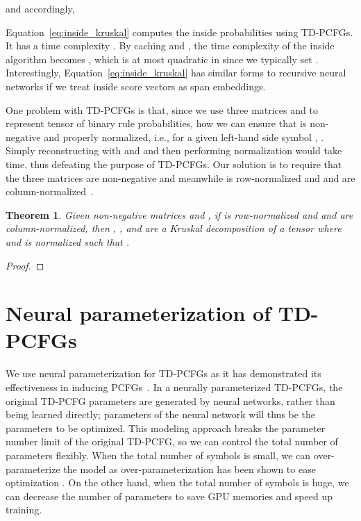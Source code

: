 \documentclass[11pt]{article}
\newtheorem{theorem}{Theorem}
\begin{document}
and accordingly,

Equation~\ref{eq:inside_kruskal} computes the inside probabilities using TD-PCFGs.
It has a time complexity .
By caching  and , the time complexity of the inside algorithm becomes  \cite{cohen-etal-2013-approximate}, which is at most quadratic in  since we typically set . Interestingly, Equation~\ref{eq:inside_kruskal} has similar forms to recursive neural networks \cite{socher-etal-2013-recursive} if we treat inside score vectors as span embeddings.

One problem with TD-PCFGs is that, since we use three matrices  and  to represent tensor  of binary rule probabilities, how we can ensure that  is non-negative and properly normalized, i.e., for a given left-hand side symbol , . 
Simply reconstructing  with  and  and then performing normalization would take  time, thus defeating the purpose of TD-PCFGs.
Our solution is to require that the three matrices are non-negative and meanwhile  is row-normalized and  and  are column-normalized~\citep{shen2018efficient}.

\begin{theorem}\label{prop:kruskal_form}
	Given non-negative matrices  and ,
	if  is row-normalized and  and  are column-normalized, then , , and  are a Kruskal decomposition of a tensor  where  and  is normalized such that .
\end{theorem}
\begin{proof}
	
\end{proof}















\section{Neural parameterization of TD-PCFGs}\label{sec:tn-pcfg}


We use neural parameterization for TD-PCFGs as it has demonstrated its effectiveness in inducing PCFGs~\citep{kim-etal-2019-compound}.
In a neurally parameterized TD-PCFGs,
the original TD-PCFG parameters are generated by neural networks,
rather than being learned directly;
parameters of the neural network will thus be the parameters to be optimized.
This modeling approach breaks the parameter number limit of the original TD-PCFG, so we can control the total number of parameters flexibly. When the total number of symbols is small, we can over-parameterize the model as over-parameterization has been shown to ease optimization \cite{DBLP:conf/icml/AroraCH18, DBLP:conf/nips/XuHM18, DBLP:conf/iclr/DuZPS19}. On the other hand, when the total number of symbols is huge, we can decrease the number of parameters to save GPU memories and speed up training. 
\end{document}
